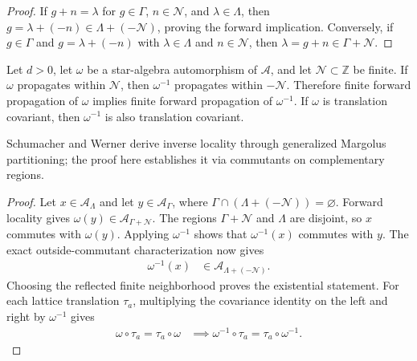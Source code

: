 \begin{proof}\leanok
    If $g+n=\lambda$ for $g\in\Gamma$, $n\in\mathcal N$, and
    $\lambda\in\Lambda$, then
    $g=\lambda+(-n)\in\Lambda+(-\mathcal N)$, proving the forward implication.
    Conversely, if $g\in\Gamma$ and $g=\lambda+(-n)$ with
    $\lambda\in\Lambda$ and $n\in\mathcal N$, then
    $\lambda=g+n\in\Gamma+\mathcal N$.
\end{proof}

\begin{lemma}
    \label{thm:qca_inverse_propagation}
    \leanok
    Let $d>0$, let $\omega$ be a star-algebra automorphism of $\mathcal A$, and
    let $\mathcal N\subset\mathbb Z$ be finite.  If $\omega$ propagates within
    $\mathcal N$, then $\omega^{-1}$ propagates within $-\mathcal N$.  Therefore
    finite forward propagation of $\omega$ implies finite forward propagation of
    $\omega^{-1}$.  If $\omega$ is translation covariant, then $\omega^{-1}$
    is also translation covariant.

    Schumacher and Werner \cite[Theorem~6, Corollary~7]{SchumacherWerner2004QCA}
    derive inverse locality through generalized Margolus partitioning; the
    proof here establishes it via commutants on complementary regions.
\end{lemma}

\begin{proof}\leanok
    Let $x\in\mathcal A_\Lambda$ and let
    $y\in\mathcal A_\Gamma$, where
    $\Gamma\cap(\Lambda+(-\mathcal N))=\varnothing$.  Forward locality gives
    $\omega(y)\in\mathcal A_{\Gamma+\mathcal N}$.  The regions
    $\Gamma+\mathcal N$ and $\Lambda$ are disjoint, so $x$ commutes with
    $\omega(y)$.  Applying $\omega^{-1}$ shows that $\omega^{-1}(x)$ commutes
    with $y$.  The exact outside-commutant characterization now gives
    \begin{align}
        \omega^{-1}(x) & \in\mathcal A_{\Lambda+(-\mathcal N)}.
    \end{align}
    Choosing the reflected finite neighborhood proves the existential statement.
    For each lattice translation $\tau_a$, multiplying the covariance identity
    on the left and right by $\omega^{-1}$ gives
    \begin{align}
        \omega\circ\tau_a=\tau_a\circ\omega
         & \implies
        \omega^{-1}\circ\tau_a=\tau_a\circ\omega^{-1}.
    \end{align}
\end{proof}

